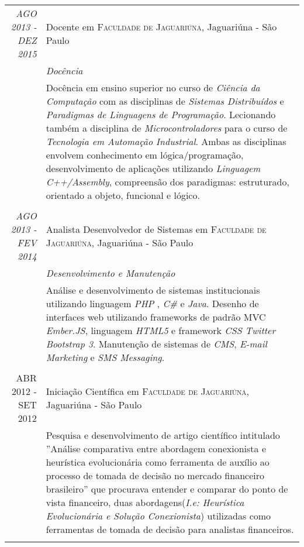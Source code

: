 \documentclass[a4paper,10pt]{article} %
\begin{document}
\begin{samepage}
\begin{tabular}{r|p{11cm}}

\emph{AGO 2013 - DEZ 2015} & Docente em \textsc{Faculdade de Jaguariúna}, Jaguariúna - São Paulo \emph{} \\
& \emph{Docência}\\ 
				& \footnotesize{Docência em ensino superior no curso de \textit{Ciência da Computação} com as disciplinas de \textit{Sistemas Distribuídos} e \textit{Paradigmas de Linguagens de Programação}. Lecionando também a disciplina de \textit{Microcontroladores} para o curso de \textit{Tecnologia em Automação Industrial}. Ambas as disciplinas envolvem conhecimento em lógica/programação, desenvolvimento de aplicações utilizando \emph{Linguagem C++/Assembly}, compreensão dos paradigmas: estruturado, orientado a objeto, funcional e lógico.}\\
\multicolumn{2}{c}{} \\


\emph{AGO 2013 - FEV 2014} & Analista Desenvolvedor de Sistemas em \textsc{Faculdade de Jaguariúna}, Jaguariúna - São Paulo \emph{}\\
& \emph{Desenvolvimento e Manutenção}\\ 
                  & \footnotesize{Análise e desenvolvimento de sistemas institucionais utilizando linguagem \textit{ PHP }, \textit{ C\# } e \textit{Java}. Desenho de interfaces web utilizando frameworks de padrão MVC \textit{Ember.JS}, linguagem \textit{HTML5} e framework \textit{CSS Twitter Bootstrap 3}. Manutenção de sistemas de \textit{CMS}, \textit{E-mail Marketing} e \textit{SMS Messaging}.}\\
\multicolumn{2}{c}{} \\


\textsc{ABR 2012 - SET 2012} & Iniciação Científica em \textsc{Faculdade de Jaguariúna}, Jaguariúna - São Paulo \emph{}\\
                           & \footnotesize{Pesquisa e desenvolvimento de artigo científico intitulado ''Análise comparativa entre abordagem conexionista e heurística evolucionária como ferramenta de auxílio ao processo de tomada de decisão no mercado financeiro brasileiro'' que procurava entender e comparar do ponto de vista financeiro, duas abordagens(\textit{I.e: Heurística Evolucionária e Solução Conexionista}) utilizadas como ferramentas de tomada de decisão para analistas financeiros.}\\
\multicolumn{2}{c}{} \\


\end{tabular}
\end{samepage}
\end{document}
